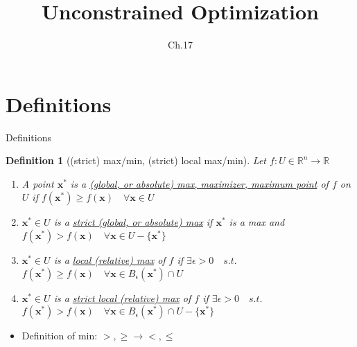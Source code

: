 \documentclass[a4paper,11pt]{article}
\author[조남운]{\mail}
\title{Unconstrained Optimization}
\subtitle{Ch.17}
\newtheorem{defn}{Definition}
\newcommand{\bb}{\mathbb}
\newcommand{\bd}{\mathbf}
\begin{document}
\maketitle


\section{Definitions} %
\label{sec:definitions}
\begin{frame}[t]{Definitions}
	\begin{defn}
		[(strict) max/min, (strict) local max/min]
		Let $f:U\in \bb{R}^n\rightarrow \bb{R}$
		\begin{enumerate}
			\item A point $\bd{x}^\ast$ is a \uline{(global, or absolute) max, maximizer, maximum point} of $f$ on $U$ if $f(\bd{x^\ast})\ge f(\bd{x})\quad\forall \bd{x}\in U$
			\item $\bd{x^\ast}\in U$ is a \uline{strict (global, or absolute) max} if $\bd{x^\ast}$ is a max and $f(\bd{x^\ast})>f(\bd{x})\quad\forall \bd{x}\in U-\{\bd{x^\ast}\}$
			\item $\bd{x^\ast}\in U$ is a \uline{local (relative) max} of $f$ if $\exists \epsilon>0 \quad s.t.$ $f(\bd{x^\ast})\ge f(\bd{x})\quad\forall \bd{x}\in B_\epsilon(\bd{x^\ast})\cap U$
			\item $\bd{x^\ast}\in U$ is a \uline{strict local (relative) max} of $f$ if $\exists \epsilon>0 \quad s.t.$ $f(\bd{x^\ast})> f(\bd{x})\quad\forall \bd{x}\in B_\epsilon(\bd{x^\ast})\cap U-\{\bd{x^\ast}\}$
		\end{enumerate}
	\end{defn}
	\begin{itemize}
		\item Definition of min: $>,\ge \rightarrow <, \le$
	\end{itemize}
\end{frame}
\end{document}
